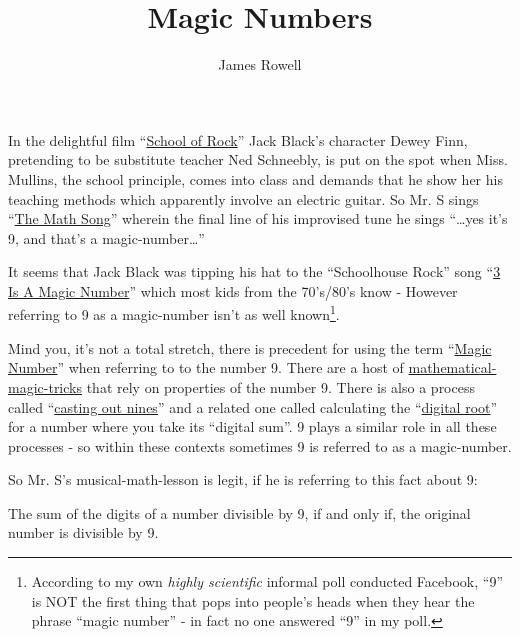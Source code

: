 \documentclass{article}
\title{Magic Numbers}
\author{James Rowell}
\begin{document}
\maketitle

In the delightful film ``\href{https://en.wikipedia.org/wiki/School_of_Rock}{School
of Rock}'' Jack Black's character Dewey Finn,
pretending to be substitute teacher Ned Schneebly, is put on the spot when
Miss. Mullins, the school principle, comes into class and demands that he show
her his teaching methods which apparently involve an electric guitar.
So Mr. S sings ``\href{https://www.youtube.com/watch?v=aa8U0nL-KXg}{The
Math Song}'' wherein the final line of his
improvised tune he sings ``\dots{}yes it's 9, and that's a magic-number\dots{}''

It seems that Jack Black was tipping his hat
to the ``Schoolhouse Rock'' song ``\href{https://youtu.be/aU4pyiB-kq0}{3
Is A Magic Number}''
which most kids from the 70's/80's know -
However referring to 9 as a magic-number isn't
as well known\footnote{According to my own \emph{highly scientific}
informal poll conducted Facebook, %
``9'' is NOT the first thing that pops into people's heads when they
hear the phrase ``magic number'' - in fact no one answered ``9'' in my poll.}.

Mind you, it's not a total stretch, there is precedent
for using the term ``\href{http://mathworld.wolfram.com/MagicNumber.html}{Magic
Number}'' when referring to to the number 9.
There are a host of
\href{http://mathematics-in-europe.eu/?p=144}{mathematical-magic-tricks}
that rely on properties of the number 9.
There is also a process called
``\href{https://en.wikipedia.org/wiki/Casting_out_nines}{casting out nines}'' and a related one 
called calculating the
``\href{http://mathworld.wolfram.com/DigitalRoot.html}{digital root}''
for a number where you take its ``digital sum''. 9
plays a similar role in all these processes - so within these contexts sometimes 9
is referred to as a magic-number.

So Mr. S's musical-math-lesson is legit, if he is referring to this fact about 9:
\begin{center}
The sum of the digits of a number divisible by 9,
\break
if and only if,
\break
the original number
is divisible by 9.
\end{center}
\end{document}

